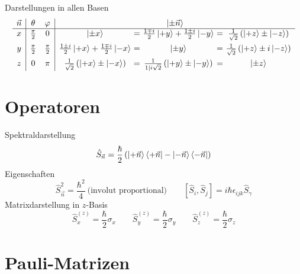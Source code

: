 Darstellungen in allen Basen \cite[Tab. nach Glg. 2.28 mit Folgerungen]{qm}
\begin{equation*}
    \begin{array}{c | c c | c @{\ =\ } c @{\ =\ } c}
        \vec{n} & \theta        & \varphi       & \multicolumn{3}{c}{\ket{\pm\vec{n}}} \\
        \hline
        x       & \frac{\pi}{2} & 0             & \ket{\pm x}                                        & \frac{1\mp i}{2}\ket{+y}+\frac{1\pm i}{2}\ket{-y}     & \frac{1}{\sqrt{2}}\left(\ket{+z}\pm\ket{-z}\right) \\[6pt]
        y       & \frac{\pi}{2} & \frac{\pi}{2} & \frac{1\pm i}{2}\ket{+x}+\frac{1\mp i}{2}\ket{-x}  & \ket{\pm y}                                           & \frac{1}{\sqrt{2}}\left(\ket{+z}\pm i\ket{-z}\right) \\[6pt]
        z       & 0             & \pi           & \frac{1}{\sqrt{2}}\left(\ket{+x}\pm\ket{-x}\right) & \frac{1}{1|i\sqrt{2}}\left(\ket{+y}\pm\ket{-y}\right) & \ket{\pm z}
    \end{array}
\end{equation*}

\section{Operatoren}

Spektraldarstellung \cite[Glg. 2.30]{qm}
\begin{equation*}
	\hat{S}_{\vec{n}} = \frac{\hbar}{2}\left(\ket{+\vec{n}}\bra{+\vec{n}}-\ket{-\vec{n}}\bra{-\vec{n}}\right)
\end{equation*}
Eigenschaften \cite[Glg. 2.35, 2.34]{qm}
\begin{equation*}
	\hat{S}_{\vec{n}}^2 = \frac{\hbar^2}{4} \ \text{(involut proportional)} \qquad \left[\hat{S}_i,\hat{S}_j\right] = i\hbar\epsilon_{ijk}\hat{S}_\gamma
\end{equation*}
Matrixdarstellung in $z$-Basis \cite[Glg. 2.31]{qm}
\begin{equation*}
    \hat{S}_x^{(z)} = \frac{\hbar}{2} \sigma_x \qquad \hat{S}_y^{(z)} = \frac{\hbar}{2} \sigma_y \qquad \hat{S}_z^{(z)} = \frac{\hbar}{2} \sigma_z
\end{equation*}

\section{Pauli-Matrizen}

